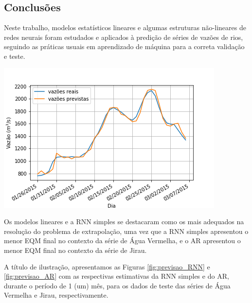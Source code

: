 \documentclass[a4paper]{article}
\newenvironment{Figure}
  {\vspace{0pt}\noindent\minipage{\linewidth}}
  {\endminipage\vspace{5pt}}
\begin{document}
\begin{multicols}{2}
\section{Conclusões}
\label{sec:conclusoes}

    Neste trabalho, modelos estatísticos lineares e algumas estruturas não-lineares de redes neurais foram estudados e aplicados à predição de séries de vazões de rios, seguindo as práticas usuais em aprendizado de máquina para a correta validação e teste. 
    
\begin{Figure}
 \centering
 \includegraphics[width=\linewidth]{saidas_vazoes_zoom_RNN.png}
\label{fig:previsao_RNN}
\end{Figure} 
    
    Os modelos lineares e a RNN simples se destacaram como os mais adequados na resolução do problema de extrapolação, uma vez que a RNN simples apresentou o menor EQM final no contexto da série de Água Vermelha, e o AR apresentou o menor EQM final no contexto da série de Jirau.

    A título de ilustração, apresentamos as Figuras \ref{fig:previsao_RNN} e \ref{fig:previsao_AR} com as respectivas estimativas da RNN simples e do AR, durante o período de 1 (um) mês, para os dados de teste das séries de Água Vermelha e Jirau, respectivamente.
    

\end{multicols}
\end{document}
